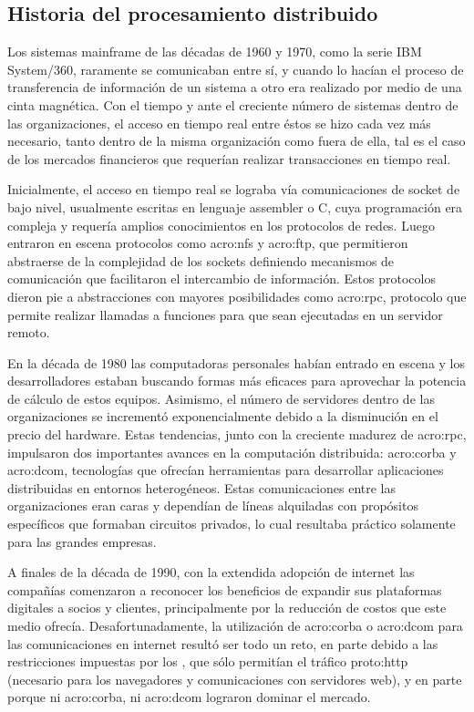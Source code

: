 \subsection{Historia del procesamiento distribuido}
\label{soa:historia}

Los sistemas mainframe de las décadas de 1960 y 1970, como la serie IBM System/360, raramente se comunicaban entre sí, y cuando lo hacían el proceso de transferencia de información de un sistema a otro era realizado por medio de una cinta magnética. Con el tiempo y ante el creciente número de sistemas dentro de las organizaciones, el acceso en tiempo real entre éstos se hizo cada vez más necesario, tanto dentro de la misma organización como fuera de ella, tal es el caso de los mercados financieros que requerían realizar transacciones en tiempo real.

Inicialmente, el acceso en tiempo real se lograba vía comunicaciones de socket de bajo nivel, usualmente escritas en lenguaje assembler o C, cuya programación era compleja y requería amplios conocimientos en los protocolos de redes. Luego entraron en escena protocolos como \gls{acro:nfs} y \gls{acro:ftp}, que permitieron abstraerse de la complejidad de los sockets definiendo mecanismos de comunicación que facilitaron el intercambio de información. Estos protocolos dieron pie a abstracciones con mayores posibilidades como \gls{acro:rpc}, protocolo que permite realizar llamadas a funciones para que sean ejecutadas en un servidor remoto.

En la década de 1980 las computadoras personales habían entrado en escena y los desarrolladores estaban buscando formas más eficaces para aprovechar la potencia de cálculo de estos equipos. Asimismo, el número de servidores dentro de las organizaciones se incrementó exponencialmente debido a la disminución en el precio del hardware. Estas tendencias, junto con la creciente madurez de \gls{acro:rpc}, impulsaron dos importantes avances en la computación distribuida: \gls{acro:corba} y \gls{acro:dcom}, tecnologías que ofrecían herramientas para desarrollar aplicaciones distribuidas en entornos heterogéneos. Estas comunicaciones entre las organizaciones eran caras y dependían de líneas alquiladas con propósitos específicos que formaban circuitos privados, lo cual resultaba práctico solamente para las grandes empresas.

A finales de la década de 1990, con la extendida adopción de internet las compañías comenzaron a reconocer los beneficios de expandir sus plataformas digitales a socios y clientes, principalmente por la reducción de costos que este medio ofrecía. Desafortunadamente, la utilización de \gls{acro:corba} o \gls{acro:dcom} para las comunicaciones en internet resultó ser todo un reto, en parte debido a las restricciones impuestas por los , que sólo permitían el tráfico \gls{proto:http} (necesario para los navegadores y comunicaciones con servidores web), y en parte porque ni \gls{acro:corba}, ni \gls{acro:dcom} lograron dominar el mercado.


